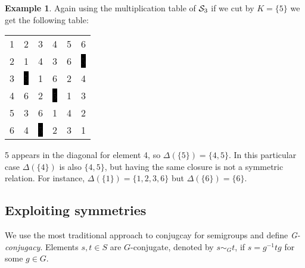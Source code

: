 \documentclass{article}
\theoremstyle{plain}
\theoremstyle{definition}
\newtheorem{example}[theorem]{Example}
\newcommand{\cS}{{\cal S}}
\begin{document}
\begin{example}
Again using the multiplication table of $\cS_3$ if we cut by $K=\{5\}$ we get the following table:
\begin{center}
\begin{tabular}{@{}c@{}c@{}c@{}c@{}c@{}c@{}}
1&2&3&4&\color{lgr}5&6\\
2&1&4&3&\color{lgr}6&\color{white}\colorbox{black}{5}\\
3&\color{white}\colorbox{black}{5}&1&6&\color{lgr}2&4\\
4&6&2&\color{white}\colorbox{black}{5}&\color{lgr}1&3\\
\color{lgr}5&\color{lgr}3&\color{lgr}6&\color{lgr}1&\color{lgr}4&\color{lgr}2\\
6&4&\color{white}\colorbox{black}{5}&2&\color{lgr}3&1\\
\end{tabular}
\end{center}
5 appears in the diagonal for element 4, so $\Delta(\{5\})=\{4,5\}$. In this particular case $\Delta(\{4\})$ is also $\{4,5\}$, but having the same closure is not a symmetric relation. For instance, $\Delta(\{1\})=\{1,2,3,6\}$ but $\Delta(\{6\})=\{6\}$. 
\end{example}






\subsection{Exploiting symmetries}

We use the most traditional approach to conjugcay for semigroups  and define \emph{G-conjugacy}. Elements $s,t\in S$ are $G$-conjugate, denoted by $s\sim_G t$, if $s=g^{-1}tg$ for some $g\in G$. 
\end{document}
